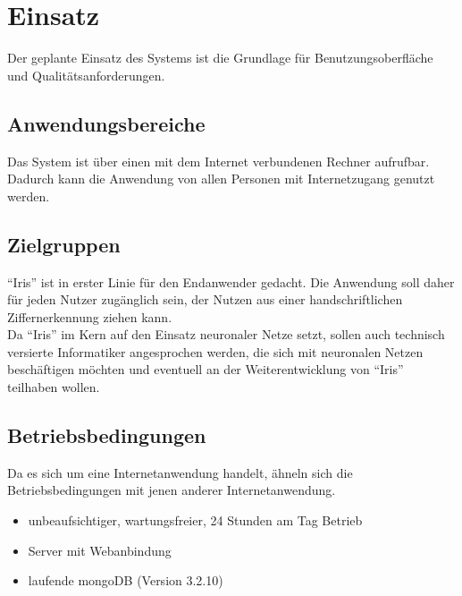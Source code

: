 \section{Einsatz}
Der geplante Einsatz des Systems ist die Grundlage für Benutzungsoberfläche und
Qualitätsanforderungen.
 
\subsection{Anwendungsbereiche}

Das System ist über einen mit dem Internet verbundenen Rechner aufrufbar. Dadurch kann die Anwendung von allen Personen mit Internetzugang genutzt werden.

\subsection{Zielgruppen}

``Iris'' ist in erster Linie für den Endanwender gedacht. Die Anwendung soll daher für jeden Nutzer zugänglich sein, der Nutzen aus einer handschriftlichen Ziffernerkennung ziehen kann.\\
Da ``Iris'' im Kern auf den Einsatz neuronaler Netze setzt, sollen auch technisch versierte Informatiker angesprochen werden, die sich mit neuronalen Netzen beschäftigen möchten und eventuell an der Weiterentwicklung von ``Iris'' teilhaben wollen.

\subsection{Betriebsbedingungen}

Da es sich um eine Internetanwendung handelt, ähneln sich die Betriebsbedingungen mit jenen anderer Internetanwendung.

\begin{itemize}
	\item unbeaufsichtiger, wartungsfreier, 24 Stunden am Tag Betrieb\\[-0.9cm]
	\item Server mit Webanbindung \\[-0.9cm]
	\item laufende mongoDB (Version 3.2.10)
\end{itemize}
